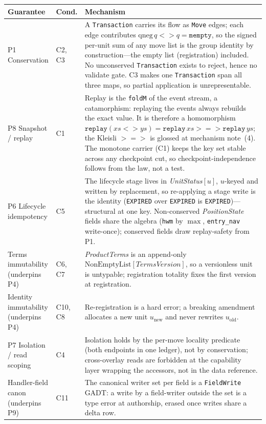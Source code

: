 \begin{center}
\small
\begin{longtable}{@{}p{3.5cm}p{1.6cm}p{6.4cm}@{}}
\toprule
\textbf{Guarantee} & \textbf{Cond.} & \textbf{Mechanism} \\
\midrule
\endhead
P1 Conservation & C2, C3 & A \texttt{Transaction} carries its flow as \texttt{Move} edges; each edge contributes $\mathrm{qneg}\,q\mathbin{<\!\!>}q=\texttt{mempty}$, so the signed per-unit sum of any move list is the group identity by construction---the empty list (registration) included. No unconserved \texttt{Transaction} exists to reject, hence no validate gate. C3 makes one \texttt{Transaction} span all three maps, so partial application is unrepresentable. \\
P8 Snapshot / replay & C1 & Replay is the \texttt{foldM} of the event stream, a catamorphism: replaying the events always rebuilds the exact value. It is therefore a homomorphism $\texttt{replay}(xs\mathbin{<\!\!>}ys)=\texttt{replay}\,xs \mathrel{>\!\!=\!\!>} \texttt{replay}\,ys$; the Kleisli $\mathbin{>\!\!=\!\!>}$ is glossed at mechanism note~(4). The monotone carrier (C1) keeps the key set stable across any checkpoint cut, so checkpoint-independence follows from the law, not a test. \\
P6 Lifecycle idempotency & C5 & The lifecycle stage lives in \emph{UnitStatus}$[u]$, $u$-keyed and written by replacement, so re-applying a stage write is the identity (\texttt{EXPIRED} over \texttt{EXPIRED} is \texttt{EXPIRED})---structural at one key. Non-conserved \emph{PositionState} fields share the algebra (\texttt{hwm} by $\max$, \texttt{entry\_nav} write-once); conserved fields draw replay-safety from P1. \\
Terms immutability (underpins P4) & C6, C7 & \emph{ProductTerms} is an append-only $\mathrm{NonEmptyList}[\mathit{TermsVersion}]$, so a versionless unit is untypable; registration totality fixes the first version at registration. \\
Identity immutability (underpins P4) & C10, C8 & Re-registration is a hard error; a breaking amendment allocates a new unit $u_{\mathrm{new}}$ and never rewrites $u_{\mathrm{old}}$. \\
P7 Isolation / read scoping & C4 & Isolation holds by the per-move locality predicate (both endpoints in one ledger), not by conservation; cross-overlay reads are forbidden at the capability layer wrapping the accessors, not in the data reference. \\
Handler-field canon (underpins P9) & C11 & The canonical writer set per field is a \texttt{FieldWrite} GADT: a write by a field-writer outside the set is a type error at authorship, erased once writes share a delta row. \\

\end{longtable}
\end{center}
